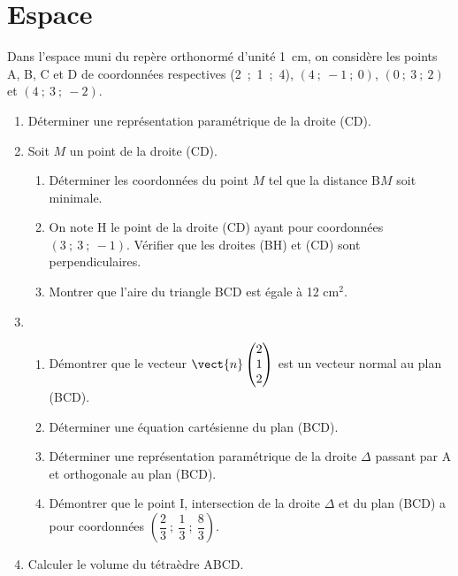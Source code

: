\documentclass{cornouaille}
\begin{document}
\section{Espace}
\begin{exercice}


Dans l'espace muni du repère orthonormé \Oijk d'unité 1~cm, on considère les points
A, B, C et D de coordonnées respectives (2~;~1~;~4), $(4~;~-1~;~0)$, $(0~;~3~;~2)$ et $(4~;~3~;~-2)$.

\medskip

\begin{enumerate}
\item Déterminer une représentation paramétrique de la droite (CD).
\item Soit $M$ un point de la droite (CD).
	\begin{enumerate}
		\item Déterminer les coordonnées du point $M$ tel que la distance B$M$ soit minimale.
		\item On note H le point de la droite (CD) ayant pour coordonnées $(3~;~3~;~- 1)$.
Vérifier que les droites (BH) et (CD) sont perpendiculaires.
		\item Montrer que l'aire du triangle BCD est égale à 12 cm$^2$.
	\end{enumerate}
\item 
	\begin{enumerate}
		\item Démontrer que le vecteur $\vect{n}\begin{pmatrix}2\\1\\2\end{pmatrix}$  est un vecteur normal au plan (BCD).
		\item Déterminer une équation cartésienne du plan (BCD).
		\item Déterminer une représentation paramétrique de la droite $\Delta$ passant par A et orthogonale
au plan (BCD).
		\item Démontrer que le point I, intersection de la droite $\Delta$ et du plan (BCD) a pour
coordonnées $\left(\dfrac{2}{3}~;~\dfrac{1}{3}~;~\dfrac{8}{3}\right)$.
	\end{enumerate}
\item  Calculer le volume du tétraèdre ABCD.
\end{enumerate}
\end{exercice}
\end{document}
